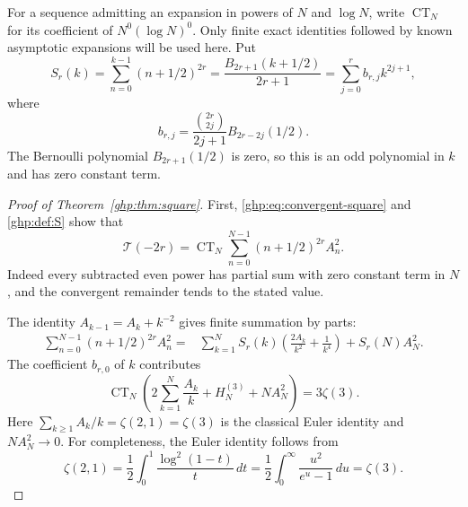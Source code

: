 \documentclass[11pt,a4paper]{article}
\numberwithin{equation}{section}
\theoremstyle{definition}
\theoremstyle{remark}
\begin{document}
For a sequence admitting an expansion in powers of $N$ and $\log N$,
write $\operatorname{CT}_N$ for its coefficient of $N^0(\log N)^0$.
Only finite exact identities followed by known asymptotic expansions
will be used here. Put
\begin{equation}\label{ghp:def:S}
 S_r(k)=\sum_{n=0}^{k-1}(n+1/2)^{2r}
  =\frac{B_{2r+1}(k+1/2)}{2r+1}
  =\sum_{j=0}^r b_{r,j}k^{2j+1},
\end{equation}
where
\begin{equation}\label{ghp:def:b}
 b_{r,j}=\frac{\binom{2r}{2j}}{2j+1}B_{2r-2j}(1/2).
\end{equation}
The Bernoulli polynomial $B_{2r+1}(1/2)$ is zero, so this is an odd
polynomial in $k$ and has zero constant term.

\begin{proof}[Proof of Theorem~\ref{ghp:thm:square}]
First, \eqref{ghp:eq:convergent-square} and \eqref{ghp:def:S} show that
\begin{equation}\label{ghp:eq:ct-reduction}
 \mathcal T(-2r)=\operatorname{CT}_N
       \sum_{n=0}^{N-1}(n+1/2)^{2r}A_n^2.
\end{equation}
Indeed every subtracted even power has partial sum with zero constant
term in $N$, and the convergent remainder tends to the stated value.

The identity $A_{k-1}=A_k+k^{-2}$ gives finite summation by parts:
\begin{align}\label{ghp:eq:partial-sum}
 \sum_{n=0}^{N-1}(n+1/2)^{2r}A_n^2
 ={}&\sum_{k=1}^N S_r(k)
          \left(\frac{2A_k}{k^2}+\frac1{k^4}\right)
       +S_r(N)A_N^2.
\end{align}
The coefficient $b_{r,0}$ of $k$ contributes
\[
 \operatorname{CT}_N
 \left(2\sum_{k=1}^N\frac{A_k}{k}+H_N^{(3)}+NA_N^2\right)
 =3\zeta(3).
\]
Here $\sum_{k\geq1}A_k/k=\zeta(2,1)=\zeta(3)$ is the classical
Euler identity and $NA_N^2\to0$. For completeness, the Euler identity
follows from
\[
 \zeta(2,1)=\frac12\int_0^1\frac{\log^2(1-t)}t\,dt
 =\frac12\int_0^\infty\frac{u^2}{e^u-1}\,du=\zeta(3).
\]


\end{proof}
\end{document}
